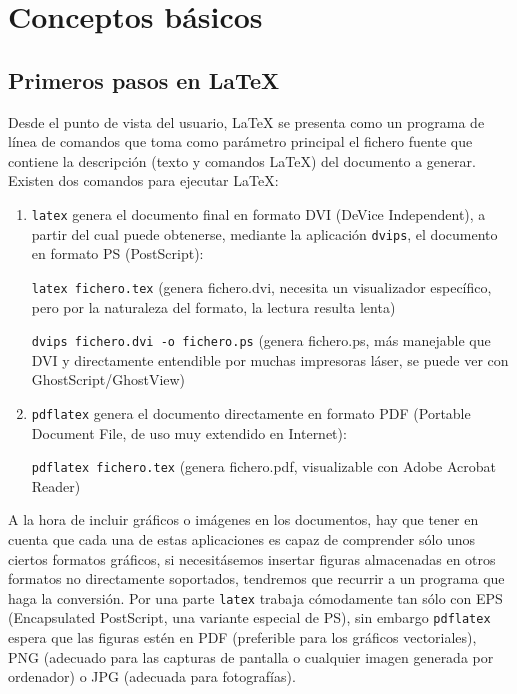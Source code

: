 \chapter{Conceptos b\'asicos}	\label{conceptos} 
                                                 
\section{Primeros pasos en \LaTeX{}} 
	Desde el punto de vista del usuario, \LaTeX{} se presenta como un programa de l\'inea de comandos que toma 
	como par\'ametro 	principal el fichero fuente que contiene la descripci\'on (texto y comandos \LaTeX{}) del 
	documento a generar. Existen dos comandos para ejecutar \LaTeX{}:
	
	\begin{enumerate}
		\item \texttt{latex} genera el documento final en formato DVI (DeVice Independent), a partir del cual puede obtenerse, 
		mediante la aplicaci\'on \texttt{dvips}, el documento en formato PS (PostScript):
		
		\texttt{latex fichero.tex} (genera fichero.dvi, necesita un visualizador espec\'ifico, pero por la naturaleza 
		del formato, la lectura resulta lenta)
		
		\texttt{dvips fichero.dvi -o fichero.ps} (genera fichero.ps, m\'as manejable que DVI y directamente entendible por 
		muchas impresoras l\'aser, se puede ver con GhostScript/GhostView)
		
		\item \texttt{pdflatex} genera el documento directamente en formato PDF (Portable Document File, de uso muy extendido 
		en Internet):
		
		\texttt{pdflatex fichero.tex} (genera fichero.pdf, visualizable con Adobe Acrobat Reader) 
	\end{enumerate}
	
	A la hora de incluir gr\'aficos o im\'agenes en los documentos, hay que tener en cuenta que cada una de estas aplicaciones 
	es capaz de comprender s\'olo unos ciertos formatos gr\'aficos, si necesit\'asemos insertar figuras almacenadas en otros 
	formatos no directamente soportados, tendremos que recurrir a un programa que haga la conversi\'on. Por una 
	parte \texttt{latex} trabaja c\'omodamente tan s\'olo con EPS (Encapsulated PostScript, una variante especial de PS), 
	sin embargo \texttt{pdflatex} espera que las figuras est\'en en PDF (preferible para los gr\'aficos vectoriales), 
	PNG (adecuado para las capturas de pantalla o cualquier imagen generada por ordenador) o JPG (adecuada para fotograf\'ias).

